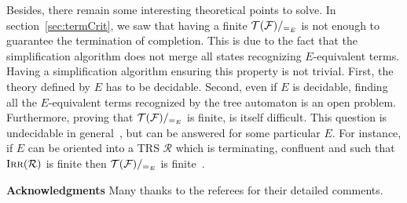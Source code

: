 \documentclass[a4paper,11pt]{llncs}
\def \R {\mathcal{R}}
\newcommand{\TF}{{\cal T(F)}}
\DeclareMathOperator{\lirr}{I\textsc{rr}}
\theoremstyle{plain}
\begin{document}
\medskip
\noindent
Besides, there remain some interesting theoretical points to solve. In
section~\ref{sec:termCrit}, we saw that having a finite $\TF/_{=_E}$ is not enough to guarantee the termination of
completion. This is due to the fact that the simplification algorithm does not
merge all states recognizing $E$-equivalent terms. Having a simplification
algorithm ensuring this property is not trivial. First,  the theory defined 
by $E$ has to be decidable. Second, even if $E$ is decidable, finding all the 
$E$-equivalent terms recognized by the tree automaton is an open problem.
Furthermore, proving that $\TF/_{=_E}$ is finite, is itself difficult. This
question is undecidable in general~\cite{TisonPrivate}, but can be answered for
some particular $E$. For instance, if $E$ can be oriented into
a TRS $\R$ which is terminating, confluent and such that $\lirr(\R)$ is finite
then $\TF/_{=_E}$ is finite~\cite{TisonPrivate}.

\medskip
\noindent
{\bf Acknowledgments} Many thanks to the referees for their detailed comments.



{\small }
\end{document}
